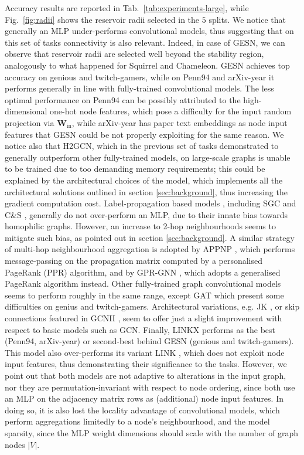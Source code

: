 \documentclass[final,5p,times,twocolumn]{elsarticle}
\begin{document}
Accuracy results are reported in Tab.~\ref{tab:experiments-large}, while Fig.~\ref{fig:radii} shows the reservoir radii selected in the $5$ splits.
We notice that generally an MLP under-performs convolutional models, thus suggesting that on this set of tasks connectivity is also relevant.
Indeed, in case of GESN, we can observe that reservoir radii are selected well beyond the stability region, analogously to what happened for Squirrel and Chameleon.
GESN achieves top accuracy on genious and twitch-gamers, while on Penn94 and arXiv-year it performs generally in line with fully-trained convolutional models.
The less optimal performance on Penn94 can be possibly attributed to the high-dimensional one-hot node features, which pose a difficulty for the input random projection via $\mathbf{W}_{\mathrm{in}}$, while arXiv-year has paper text embeddings as node input features that GESN could be not properly exploiting for the same reason.
We notice also that H2GCN, which in the previous set of tasks demonstrated to generally outperform other fully-trained models, on large-scale graphs is unable to be trained due to too demanding memory requirements; this could be explained by the architectural choices of the model, which implements all the architectural solutions outlined in section \ref{sec:background}, thus increasing the gradient computation cost.
Label-propagation based models \cite{Zhou2004}, including SGC \cite{Wu2019} and C\&S \cite{Huang2021}, generally do not over-perform an MLP, due to their innate bias towards homophilic graphs.
However, an increase to 2-hop neighbourhoods seems to mitigate such bias, as pointed out in section \ref{sec:background}.
A similar strategy of multi-hop neighbourhood aggregation is adopted by APPNP \cite{Klicpera2019}, which performs message-passing on the propagation matrix computed by a personalised PageRank (PPR) algorithm, and by GPR-GNN \cite{Chien2021}, which adopts a generalised PageRank algorithm instead.
Other fully-trained graph convolutional models seems to perform roughly in the same range, except GAT \cite{Velickovic2018} which present some difficulties on genius and twitch-gamers.
Architectural variations, e.g. JK \cite{Xu2018}, or skip connections featured in GCNII \cite{ChenMing2020}, seem to offer just a slight improvement with respect to basic models such as GCN.
Finally, LINKX \cite{Lim2021} performs as the best (Penn94, arXiv-year) or second-best behind GESN (genious and twitch-gamers).
This model also over-performs its variant LINK \cite{Zheleva2009}, which does not exploit node input features, thus demonstrating their significance to the tasks.
However, we point out that both models are not adaptive to alterations in the input graph, nor they are permutation-invariant with respect to node ordering, since both use an MLP on the adjacency matrix rows as (additional) node input features.
In doing so, it is also lost the locality advantage of convolutional models, which perform aggregations limitedly to a node's neighbourhood, and the model sparsity, since the MLP weight dimensions should scale with the number of graph nodes $|V|$.
\end{document}
